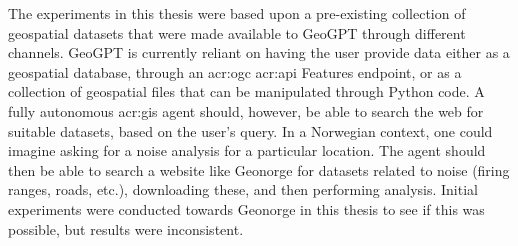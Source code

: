 The experiments in this thesis were based upon a pre-existing collection of geospatial datasets that were made available to GeoGPT through different channels. GeoGPT is currently reliant on having the user provide data either as a geospatial database, through an \acrshort{acr:ogc} \acrshort{acr:api} Features endpoint, or as a collection of geospatial files that can be manipulated through Python code.  A fully autonomous \acrshort{acr:gis} agent should, however, be able to search the web for suitable datasets, based on the user's query. In a Norwegian context, one could imagine asking for a noise analysis for a particular location. The agent should then be able to search a website like Geonorge for datasets related to noise (firing ranges, roads, etc.), downloading these, and then performing analysis. Initial experiments were conducted towards Geonorge in this thesis to see if this was possible, but results were inconsistent.